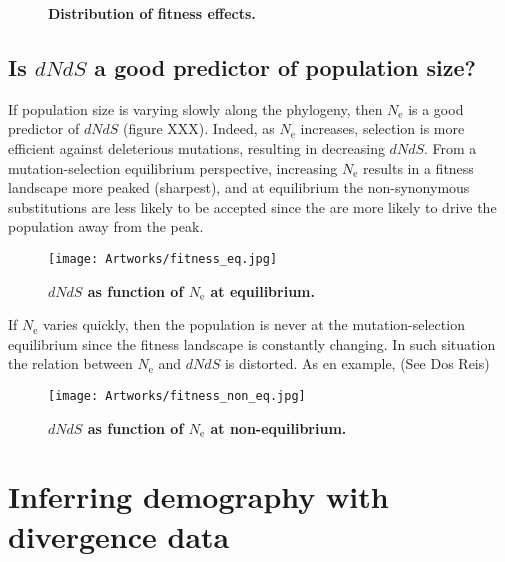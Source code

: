 \documentclass{article}
\newcommand{\e}{\mathrm{e}}
\newcommand{\dnds}{dNdS}
\newcommand{\Ne}{N_\e}
\newcommand{\scaledfit}{F}
\newcommand{\scaledselcoef}{{\Delta \scaledfit}}
\begin{document}
\begin{figure}[H]
	\centering
	\caption{\textbf{Distribution of fitness effects.}}
\end{figure}
\subsection{Is $\dnds$ a good predictor of population size?}

If population size is varying slowly along the phylogeny, then $\Ne$ is a good predictor of $\dnds$ (figure XXX).
Indeed, as $\Ne$ increases, selection is more efficient against deleterious mutations, resulting in decreasing $\dnds$.
From a mutation-selection equilibrium perspective, increasing $\Ne$ results in a fitness landscape more peaked (sharpest), and at equilibrium the non-synonymous substitutions are less likely to be accepted since the are more likely to drive the population away from the peak.

\begin{figure}[H]
	\centering
	\texttt{[image: Artworks/fitness\_eq.jpg]}
	\caption{\textbf{$\dnds$ as function of $\Ne$ at equilibrium.}}
\end{figure}

If $\Ne$ varies quickly, then the population is never at the mutation-selection equilibrium since the fitness landscape is constantly changing.
In such situation the relation between $\Ne$ and $\dnds$ is distorted.
As en example,  (See Dos Reis)

\begin{figure}[H]
	\centering
	\texttt{[image: Artworks/fitness\_non\_eq.jpg]}
	\caption{\textbf{$\dnds$ as function of $\Ne$ at non-equilibrium.}}
\end{figure}

\section{Inferring demography with divergence data}
\end{document}
